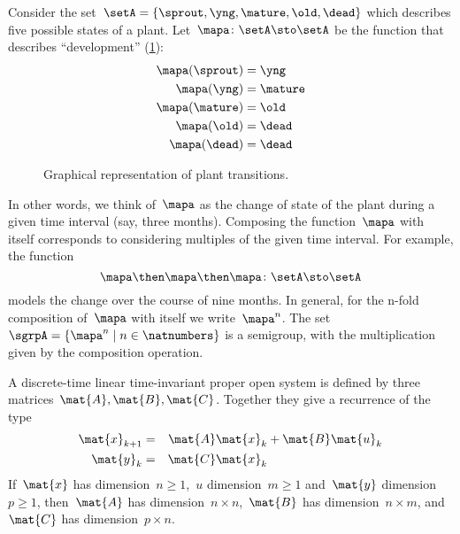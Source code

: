 \begin{example}
  \label{plant-trafo-semigroup}
  Consider the set~$\setA = \{ \sprout, \yng, \mature, \old, \dead \}$ which describes five possible states of a plant. Let~$\mapa \colon \setA \sto \setA$ be the function that describes ``development'' (\cref{fig:plants_transitions}):
  \begin{align*}
    \mapa(\sprout) &=  \yng \\
    \mapa(\yng) &=  \mature \\
    \mapa(\mature) &=  \old \\
    \mapa( \old) &= \dead \\
    \mapa (\dead) &= \dead
  \end{align*}
  \begin{figure}[h]
    \caption{Graphical representation of plant transitions.}
    \label{fig:plants_transitions}
\end{figure}
  In other words, we think of~$\mapa$ as the change of state of the plant during a given time interval (say, three months).
  Composing the function~$\mapa$ with itself corresponds to considering multiples of the given time interval.
  For example, the function
  \begin{equation*}
    \mapa \then \mapa \then \mapa \colon \setA \sto \setA
  \end{equation*}
  models the change over the course of nine months.
  In general, for the n-fold composition of~$\mapa$ with itself we write~$\mapa^n$.
  The set~$\sgrpA = \{ \mapa^n \mid n \in \natnumbers \}$ is a semigroup, with the multiplication given by the composition operation.
\end{example}

\label{ex:discrete-time-linear}
\begin{definition}
  \label{def:dicrete-time-linear-system}
  A discrete-time linear time-invariant proper open system is defined by three matrices~$\mat{A},\mat{B},\mat{C}$.
  Together they give a recurrence of the type
  \begin{equation}
    \label{eq:discrete-time-dynamics}
    \begin{aligned}
      \mat{x}_{k+1} &=& \mat{A} \mat{x}_k & + \mat{B} \mat{u}_k \\
      \mat{y}_{k}   &=& \mat{C} \mat{x}_k  \\
    \end{aligned}
  \end{equation}
  If~$\mat{x}$ has dimension~$n\geq1$,~$u$ dimension~$m\geq1$ and~$\mat{y}$ dimension~$p\geq1$, then~$\mat{A}$ has dimension~$n \times n$,~$\mat{B}$ has dimension~$n \times m$, and~$\mat{C}$ has dimension~$p \times n$.
\end{definition}

